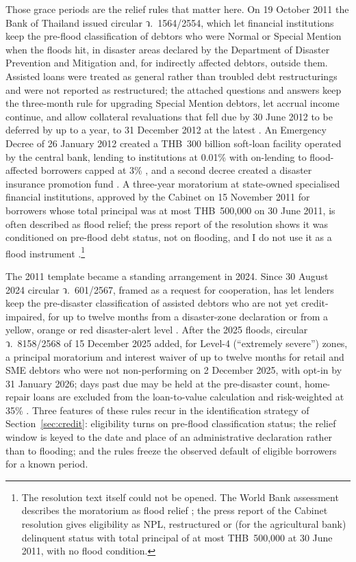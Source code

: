 Those grace periods are the relief rules that matter here. On 19 October 2011 the Bank of Thailand issued circular ว.~1564/2554, which let financial institutions keep the pre-flood classification of debtors who were Normal or Special Mention when the floods hit, in disaster areas declared by the Department of Disaster Prevention and Mitigation and, for indirectly affected debtors, outside them. Assisted loans were treated as general rather than troubled debt restructurings and were not reported as restructured; the attached questions and answers keep the three-month rule for upgrading Special Mention debtors, let accrual income continue, and allow collateral revaluations that fell due by 30 June 2012 to be deferred by up to a year, to 31 December 2012 at the latest \citep{bot2011circular1564}. An Emergency Decree of 26 January 2012 created a THB~300 billion soft-loan facility operated by the central bank, lending to institutions at 0.01\% with on-lending to flood-affected borrowers capped at 3\% \citep{bot2012emergency}, and a second decree created a disaster insurance promotion fund \citep{bot2012catastrophe}. A three-year moratorium at state-owned specialised financial institutions, approved by the Cabinet on 15 November 2011 for borrowers whose total principal was at most THB~500,000 on 30 June 2011, is often described as flood relief; the press report of the resolution shows it was conditioned on pre-flood debt status, not on flooding, and I do not use it as a flood instrument \citep{mgr2011cabinetmoratorium}.\footnote{The resolution text itself could not be opened. The World Bank assessment describes the moratorium as flood relief \citep[Table~21]{worldbank2012thai}; the press report of the Cabinet resolution gives eligibility as NPL, restructured or (for the agricultural bank) delinquent status with total principal of at most THB~500,000 at 30 June 2011, with no flood condition.}

The 2011 template became a standing arrangement in 2024. Since 30 August 2024 circular ว.~601/2567, framed as a request for cooperation, has let lenders keep the pre-disaster classification of assisted debtors who are not yet credit-impaired, for up to twelve months from a disaster-zone declaration or from a yellow, orange or red disaster-alert level \citep{bot2024circular601,bot2024relief}. After the 2025 floods, circular ว.~8158/2568 of 15 December 2025 added, for Level-4 (``extremely severe'') zones, a principal moratorium and interest waiver of up to twelve months for retail and SME debtors who were not non-performing on 2 December 2025, with opt-in by 31 January 2026; days past due may be held at the pre-disaster count, home-repair loans are excluded from the loan-to-value calculation and risk-weighted at 35\% \citep{bot2025level4}. Three features of these rules recur in the identification strategy of Section~\ref{sec:credit}: eligibility turns on pre-flood classification status; the relief window is keyed to the date and place of an administrative declaration rather than to flooding; and the rules freeze the observed default of eligible borrowers for a known period.

